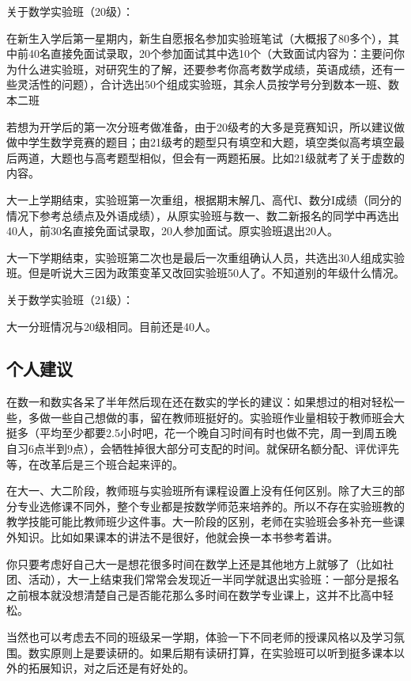 \documentclass{my_paper}
\begin{document}
关于数学实验班（20级）：

在新生入学后第一星期内，新生自愿报名参加实验班\textcolor[rgb]{1,0,0}{笔试}（大概报了80多个），其中前40名直接免面试录取，20个参加面试其中选10个（大致面试内容为：主要问你为什么进实验班，对研究生的了解，还要参考你高考数学成绩，英语成绩，还有一些灵活性的问题），合计选出50个组成实验班，其余人员按学号分到数本一班、数本二班

\textcolor[rgb]{1,0,0}{若想为开学后的第一次分班考做准备，由于20级考的大多是竞赛知识，所以建议做做中学生数学竞赛的题目；由21级考的题型只有填空和大题，填空类似高考填空最后两道，大题也与高考题型相似，但会有一两题拓展。比如21级就考了关于虚数的内容。}

大一上学期结束，实验班第一次重组，根据期末解几、高代I、数分I成绩（同分的情况下参考总绩点及外语成绩），从原实验班与数一、数二新报名的同学中再选出40人，前30名直接免面试录取，20人参加面试。原实验班退出20人。

大一下学期结束，实验班第二次也是最后一次重组确认人员，共选出30人组成实验班。但是听说大三因为政策变革又改回实验班50人了。不知道别的年级什么情况。

关于数学实验班（21级）： 

大一分班情况与20级相同。目前还是40人。


\subsection{个人建议}
在数一和数实各呆了半年然后现在还在数实的学长的建议：如果想过的相对轻松一些，多做一些自己想做的事，留在教师班挺好的。实验班作业量相较于教师班会大挺多（平均至少都要2.5小时吧，花一个晚自习时间有时也做不完，周一到周五晚自习6点半到9点），会牺牲掉很大部分可支配的时间。\textcolor[rgb]{1,0,0}{就保研名额分配、评优评先等，在改革后是三个班合起来评的。}

在大一、大二阶段，教师班与实验班所有课程设置上\textcolor[rgb]{1,0,0}{没有任何区别}。除了大三的部分专业选修课不同外，整个专业都是按\textcolor[rgb]{1,0,0}{数学师范}来培养的。所以不存在实验班教的教学技能可能比教师班少这件事。大一阶段的区别，老师在实验班会多补充一些课外知识。比如如果课本的讲法不是很好，他就会换一本书参考着讲。

你只要考虑好自己大一是想花很多时间在数学上还是其他地方上就够了（比如社团、活动），大一上结束我们常常会发现近一半同学就退出实验班：一部分是报名之前根本就没想清楚自己是否能花那么多时间在数学专业课上，这并不比高中轻松。

当然也可以考虑去不同的班级呆一学期，体验一下不同老师的授课风格以及学习氛围。数实原则上是要读研的。如果后期有读研打算，在实验班可以听到挺多课本以外的拓展知识，对之后还是有好处的。
\end{document}
